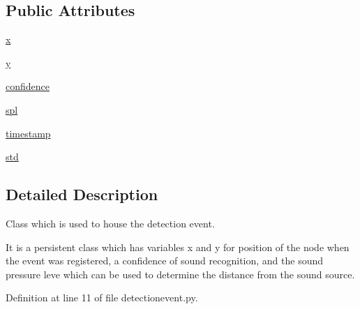 \subsection*{Public Attributes}
\begin{DoxyCompactItemize}
\item 
\hyperlink{classlocaudio_1_1detectionevent_1_1DetectionEvent_ae36950069a6f55e1f6e0251dbe80b0d4}{x}
\item 
\hyperlink{classlocaudio_1_1detectionevent_1_1DetectionEvent_aab867d871d3ab2bc608936ab64051b56}{y}
\item 
\hyperlink{classlocaudio_1_1detectionevent_1_1DetectionEvent_af0b955e105202f670cee964ce52d911f}{confidence}
\item 
\hyperlink{classlocaudio_1_1detectionevent_1_1DetectionEvent_aba6f9b944aea803742ef4aed6e34f215}{spl}
\item 
\hyperlink{classlocaudio_1_1detectionevent_1_1DetectionEvent_a6645f181c7102ed07a9f13e7be72f366}{timestamp}
\item 
\hyperlink{classlocaudio_1_1detectionevent_1_1DetectionEvent_a334aaaf37d349d42cd8c1a46af80181f}{std}
\end{DoxyCompactItemize}


\subsection{Detailed Description}
Class which is used to house the detection event. 

It is a persistent class which has variables x and y for position of the node when the event was registered, a confidence of sound recognition, and the sound pressure leve which can be used to determine the distance from the sound source. 

Definition at line 11 of file detectionevent.\-py.



